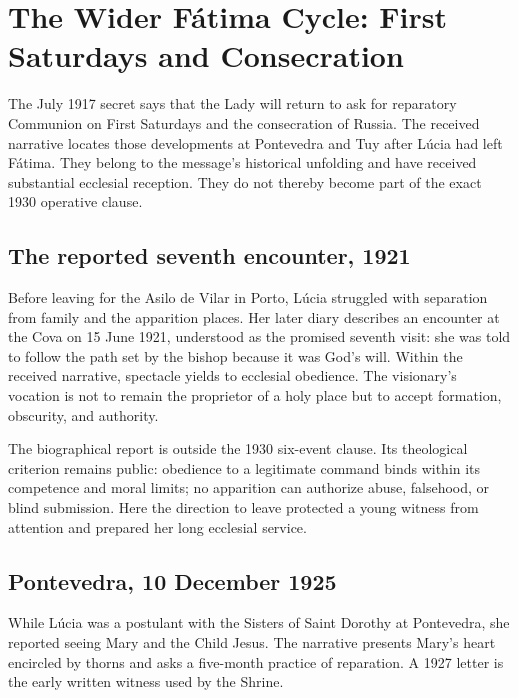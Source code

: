 \section{The Wider Fátima Cycle: First Saturdays and Consecration}

The July 1917 secret says that the Lady will return to ask for reparatory Communion on First Saturdays and the consecration of Russia. The received narrative locates those developments at Pontevedra and Tuy after Lúcia had left Fátima. They belong to the message's historical unfolding and have received substantial ecclesial reception. They do not thereby become part of the exact 1930 operative clause.

\subsection{The reported seventh encounter, 1921}

Before leaving for the Asilo de Vilar in Porto, Lúcia struggled with separation from family and the apparition places. Her later diary describes an encounter at the Cova on 15 June 1921, understood as the promised seventh visit: she was told to follow the path set by the bishop because it was God's will. Within the received narrative, spectacle yields to ecclesial obedience. The visionary's vocation is not to remain the proprietor of a holy place but to accept formation, obscurity, and authority.

The biographical report is outside the 1930 six-event clause. Its theological criterion remains public: obedience to a legitimate command binds within its competence and moral limits; no apparition can authorize abuse, falsehood, or blind submission. Here the direction to leave protected a young witness from attention and prepared her long ecclesial service.

\subsection{Pontevedra, 10 December 1925}

While Lúcia was a postulant with the Sisters of Saint Dorothy at Pontevedra, she reported seeing Mary and the Child Jesus. The narrative presents Mary's heart encircled by thorns and asks a five-month practice of reparation. A 1927 letter is the early written witness used by the Shrine.

